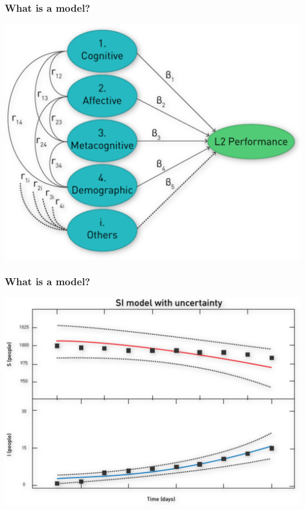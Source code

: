 \documentclass[12pt, block=fill]{beamer}
\begin{document}
\begin{frame}
  \frametitle{What is a model?}
  \begin{center}
    \includegraphics[width=0.9\linewidth]{figures/model_a.png}
  \end{center}
\end{frame}

\begin{frame}
  \frametitle{What is a model?}
  \begin{center}
    \includegraphics[width=0.9\linewidth]{figures/model_b.png}     
  \end{center}
\end{frame}
\end{document}
